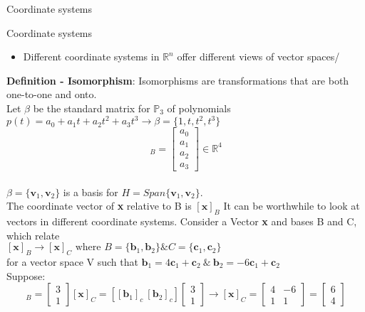 \documentclass[a4paper, 12pt]{article}
\begin{document}
\begin{section}{Coordinate systems}
\begin{subsection}{Coordinate systems}
\begin{itemize}
\item{Different coordinate systems in $\mathbb{R}^{n}$ offer different views of 
	vector spaces}/
\end{itemize}
\textbf{Definition - Isomorphism}: Isomorphisms are transformations that are both one-to-one
and onto.\\
Let $\beta$ be the standard matrix for $\mathbb{P}_{3}$ of polynomials $p(t)=a_0+
a_1t+a_2t^{2}+a_3t^{3} \to \beta=\{1,t,t^{2},t^{3}\}$\\
\begin{equation}
[P]_{B}=\begin{bmatrix} a_0\\a_1\\a_2\\a_3 \end{bmatrix} \in \mathbb{R}^{4}
\end{equation}
\\ $\beta =\{\textbf{v}_{1},\textbf{v}_{2}\}$ is a basis for 
$H=Span\{\textbf{v}_{1},\textbf{v}_{2}\}$.\\ 
The coordinate vector of \textbf{x} relative to B is $[\textbf{x}]_{B}$
It can be worthwhile to look at vectors in different coordinate systems. Consider
a Vector \textbf{x} and bases B and C, which relate\\ 
$[\textbf{x}]_{B} \to [\textbf{x}]_{C} \mbox{ where } B=\{\textbf{b}_{1},
\textbf{b}_{2}\} \& C=\{\textbf{c}_{1},\textbf{c}_{2}\}$\\ 
for a vector space V such that 
$\textbf{b}_{1}=4\textbf{c}_{1}+\textbf{c}_{2} ~\& ~\textbf{b}_{2}=
-6\textbf{c}_{1}+\textbf{c}_{2}$ \\ Suppose:\\
\begin{equation}
[\textbf{x}]_{B}=\begin{bmatrix} 3\\1 \end{bmatrix} 
[\textbf{x}]_{C}=[[\textbf{b}_{1}]_{c}~[\textbf{b}_{2}]_{c}]\begin{bmatrix} 3\\1
\end{bmatrix} \to [\textbf{x}]_{C}=\begin{bmatrix} 4&-6\\ 1&1 \end{bmatrix} =
\begin{bmatrix} 6\\4 \end{bmatrix} 
\end{equation}
\end{subsection}

\end{section}
\end{document}
